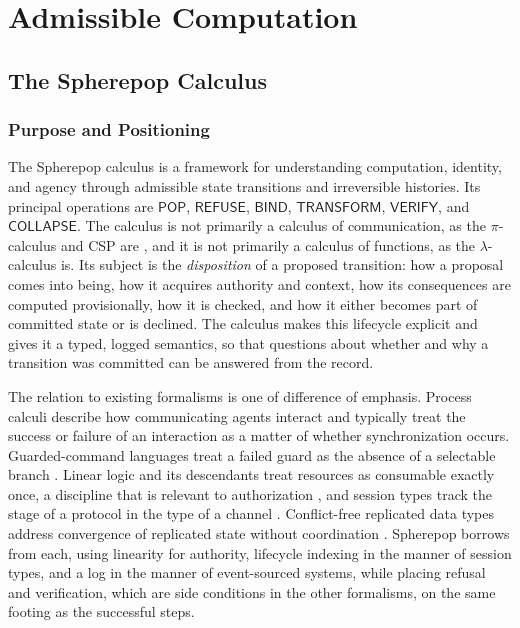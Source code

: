 \documentclass[11pt,twoside,openright]{book}
\theoremstyle{plain}
\theoremstyle{definition}
\theoremstyle{remark}
\newcommand{\pop}{\mathsf{POP}}
\newcommand{\refuse}{\mathsf{REFUSE}}
\newcommand{\bind}{\mathsf{BIND}}
\newcommand{\transform}{\mathsf{TRANSFORM}}
\newcommand{\verify}{\mathsf{VERIFY}}
\newcommand{\collapse}{\mathsf{COLLAPSE}}
\begin{document}
\part{Admissible Computation}

\chapter{The Spherepop Calculus}
\label{ch:sp}

\section{Purpose and Positioning}

The Spherepop calculus is a framework for understanding computation, identity, and agency through admissible state transitions and irreversible histories. Its principal operations are $\pop$, $\refuse$, $\bind$, $\transform$, $\verify$, and $\collapse$. The calculus is not primarily a calculus of communication, as the $\pi$-calculus and CSP are \cite{milner1999,hoare1978}, and it is not primarily a calculus of functions, as the $\lambda$-calculus is. Its subject is the \emph{disposition} of a proposed transition: how a proposal comes into being, how it acquires authority and context, how its consequences are computed provisionally, how it is checked, and how it either becomes part of committed state or is declined. The calculus makes this lifecycle explicit and gives it a typed, logged semantics, so that questions about whether and why a transition was committed can be answered from the record.

The relation to existing formalisms is one of difference of emphasis. Process calculi describe how communicating agents interact and typically treat the success or failure of an interaction as a matter of whether synchronization occurs. Guarded-command languages treat a failed guard as the absence of a selectable branch \cite{dijkstra1975}. Linear logic and its descendants treat resources as consumable exactly once, a discipline that is relevant to authorization \cite{girard1987}, and session types track the stage of a protocol in the type of a channel \cite{honda1998}. Conflict-free replicated data types address convergence of replicated state without coordination \cite{shapiro2011}. Spherepop borrows from each, using linearity for authority, lifecycle indexing in the manner of session types, and a log in the manner of event-sourced systems, while placing refusal and verification, which are side conditions in the other formalisms, on the same footing as the successful steps.
\end{document}
